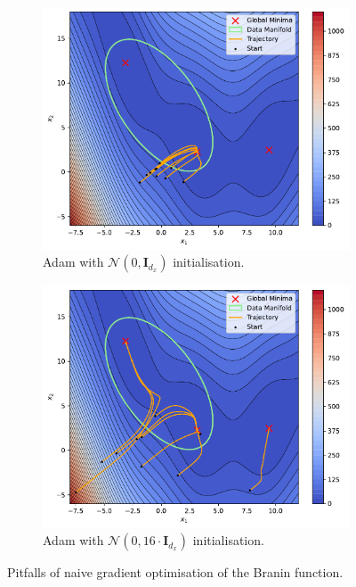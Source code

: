 \begin{figure}[t]
    \centering
    \begin{subfigure}[b]{0.48\textwidth}
        \centering
        \includegraphics[width=1\textwidth]{assets/adam_branin.pdf}
        \caption{Adam with $\mathcal{N}(0, \mathbf{I}_{d_x})$ initialisation.}
        \label{fig:branin-adam-a}
    \end{subfigure}
    \hfill
    \begin{subfigure}[b]{0.48\textwidth}
        \centering
        \includegraphics[width=1\textwidth]{assets/adam_larger_branin.pdf}
        \caption{Adam with $\mathcal{N}(0, 16\cdot\mathbf{I}_{d_x})$ initialisation.}
        \label{fig:branin-adam-b}
    \end{subfigure}
    \caption{Pitfalls of naive gradient optimisation of the Branin function.}
    \label{fig:branin-adam}
\end{figure}

